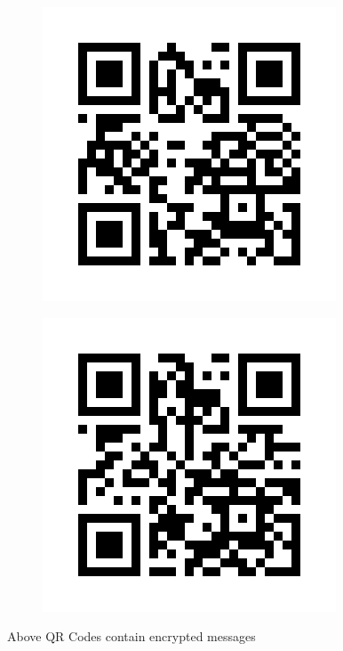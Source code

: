\documentclass[journal=tosc,preprint]{iacrtrans}
\begin{document}
    \begin{figure}[h!]
    \centering
    \begin{subfigure}[b]{0.45\textwidth}
        \centering
        \includegraphics[width=\textwidth]{message.png} %
        \label{fig:image1}
    \end{subfigure}
    \hfill
    \begin{subfigure}[b]{0.45\textwidth}
        \centering
        \includegraphics[width=\textwidth]{birth.png} %
        \label{fig:image2}
    \end{subfigure}

    \caption{Above QR Codes contain encrypted messages}
    \label{fig:two_images}
\end{figure}
\end{document}
